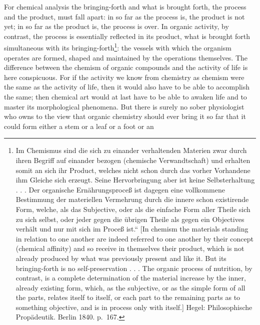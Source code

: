 \documentclass[12pt,a4paper]{book}
\begin{document}
For chemical analysis the bringing-forth and what is brought forth, the process
and the product, must fall apart: in so far as the process is, the product is
not yet; in so far as the product is, the process is over. In organic activity,
by contrast, the process is essentially reflected in its product, what is
brought forth simultaneous with its bringing-forth\footnote{%
Im Chemismus sind die sich zu einander verhaltenden Materien zwar
durch ihren Begriff auf einander bezogen (chemische
Verwandtschaft) und erhalten somit an sich ihr Product, welches
nicht schon durch das vorher Vorhandene ihm Gleiche sich erzeugt.
Seine Hervorbringung aber ist keine Selbsterhaltung . . . Der
organische Ernährungsproceß ist dagegen eine vollkommene
Bestimmung der materiellen Vermehrung durch die innere schon
existirende Form, welche, als das Subjective, oder als die einfache
Form aller Theile sich zu sich selbst, oder jeder gegen die
übrigen Theile als gegen ein Objectives verhält und nur mit sich
im Proceß ist.“ [In chemism the materials standing in relation to one another
are indeed referred to one another by their concept (chemical affinity) and so
receive in themselves their product, which is not already produced by what was
previously present and like it. But its bringing-forth is no self-preservation
. . . The organic process of nutrition, by contrast, is a complete determination
of the material increase by the inner, already existing form, which, as the
subjective, or as the simple form of all the parts, relates itself to itself,
or each part to the remaining parts as to something objective, and is in
process only with itself.] Hegel: Philosophische Propädeutik. Berlin 1840.
p.~167.}: the vessels with which
\setcounter{footnote}{0}
the organism operates are formed, shaped and maintained by the operations
themselves. The difference between the chemism of organic compounds and the
activity of life is here conspicuous. For if the activity we know from
chemistry as chemism were the same as the activity of life, then it would also
have to be able to accomplish the same; then chemical art would at last have to
be able to awaken life and to master its morphological phenomena. But there is
surely no sober physiologist who owns to the view that organic chemistry should
ever bring it so far that it could form either a stem or a leaf or a foot or an
\end{document}

